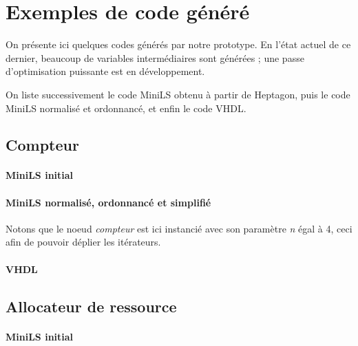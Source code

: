 \documentclass[a4paper]{article}
\newcommand{\LANG}{Heptagon}
\begin{document}
\appendix

\section{Exemples de code g\'en\'er\'e}

On pr\'esente ici quelques codes g\'en\'er\'es par notre prototype. En l'\'etat actuel de
ce dernier, beaucoup de variables interm\'ediaires sont g\'en\'er\'ees ; une passe
d'optimisation puissante est en d\'eveloppement.

On liste successivement le code MiniLS obtenu \`a partir de \LANG{}, puis le code
MiniLS normalis\'e et ordonnanc\'e, et enfin le code VHDL.

\subsection{Compteur}

\paragraph{MiniLS initial}

\small

\normalsize

\paragraph{MiniLS normalis\'e, ordonnanc\'e et simplifi\'e}

Notons que le noeud \textit{compteur} est ici instanci\'e avec son param\`etre
\textit{n} \'egal \`a 4, ceci afin de pouvoir d\'eplier les it\'erateurs.

\small

\normalsize

\paragraph{VHDL}

\small

\normalsize

\subsection{Allocateur de ressource}

\paragraph{MiniLS initial}
\end{document}
